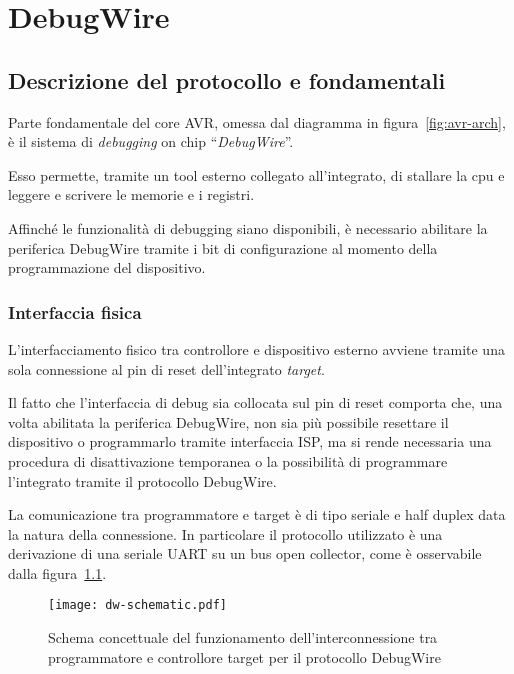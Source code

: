 \chapter{DebugWire}
\section{Descrizione del protocollo e fondamentali}

Parte fondamentale del core AVR, omessa dal diagramma in figura~\ref{fig:avr-arch}, è il sistema di \textit{debugging} on chip ``\textit{DebugWire}''.

Esso permette, tramite un tool esterno collegato all'integrato, di stallare la cpu e leggere e scrivere le memorie e i registri.\cite[sec 25]{avr:m328p}

Affinché le funzionalità di debugging siano disponibili, è necessario abilitare la periferica DebugWire tramite i bit di configurazione al momento della programmazione del dispositivo\cite[tab 28-7]{avr:m328p}.

\subsection{Interfaccia fisica}

L'interfacciamento fisico tra controllore e dispositivo esterno avviene tramite una sola connessione al pin di reset dell'integrato \textit{target}.

Il fatto che l'interfaccia di debug sia collocata sul pin di reset comporta che, una volta abilitata la periferica DebugWire, non sia più possibile resettare il dispositivo o programmarlo tramite interfaccia ISP\cites{avr:appnote:isp}[sec 25.3]{avr:m328p}, ma si rende necessaria una procedura di disattivazione temporanea o la possibilità di programmare l'integrato tramite il protocollo DebugWire.

La comunicazione tra programmatore e target è di tipo seriale e half duplex data la natura della connessione. In particolare il protocollo utilizzato è una derivazione di una seriale UART su un bus open collector, come è osservabile dalla figura~\ref{fig:dw-schematic}\cite{site:dw-reverse-engeneering}.

\begin{figure}[t]
    \centering
    \texttt{[image: dw-schematic.pdf]}
    \caption[]{Schema concettuale del funzionamento dell'interconnessione tra programmatore e controllore target per il protocollo DebugWire}\label{fig:dw-schematic}
\end{figure}

